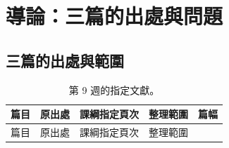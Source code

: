 \chapter{導論：三篇的出處與問題}
\label{ch:intro}

\section{三篇的出處與範圍}
\label{sec:intro-1}

\begin{longtable}[]{@{}
  >{\raggedright\arraybackslash}p{}
  >{\raggedright\arraybackslash}p{}
  >{\raggedright\arraybackslash}p{}
  >{\raggedright\arraybackslash}p{}
  >{\raggedright\arraybackslash}p{}@{}}
\caption{第 9 週的指定文獻。}\tabularnewline
\toprule\noalign{}
\begin{minipage}[b]{\linewidth}\raggedright
篇目
\end{minipage} & \begin{minipage}[b]{\linewidth}\raggedright
原出處
\end{minipage} & \begin{minipage}[b]{\linewidth}\raggedright
課綱指定頁次
\end{minipage} & \begin{minipage}[b]{\linewidth}\raggedright
整理範圍
\end{minipage} & \begin{minipage}[b]{\linewidth}\raggedright
篇幅
\end{minipage} \\
\midrule\noalign{}
\endfirsthead
\toprule\noalign{}
\begin{minipage}[b]{\linewidth}\raggedright
篇目
\end{minipage} & \begin{minipage}[b]{\linewidth}\raggedright
原出處
\end{minipage} & \begin{minipage}[b]{\linewidth}\raggedright
課綱指定頁次
\end{minipage} & \begin{minipage}[b]{\linewidth}\raggedright
整理範圍
\end{minipage} & \begin{minipage}[b]{\linewidth}\raggedright

\end{minipage}
\end{longtable}
